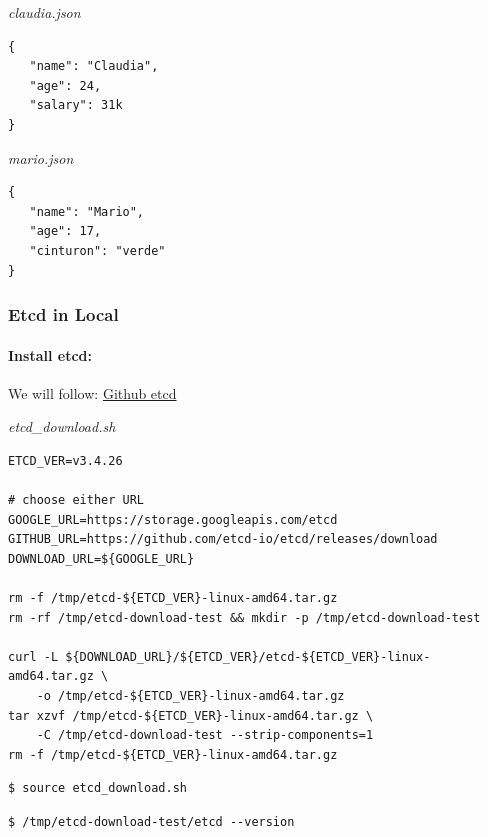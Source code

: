 \documentclass{article}
\newenvironment{codetemplate}[1][]{%
  \mybasecolorbox[#1]
  \itshape
}{%
  \endmybasecolorbox
}
\begin{document}
\begin{codetemplate}{claudia.json}
\begin{verbatim}
{
   "name": "Claudia",
   "age": 24,
   "salary": 31k
}
\end{verbatim}
\end{codetemplate}

\begin{codetemplate}{mario.json}
\begin{verbatim}
{
   "name": "Mario",
   "age": 17,
   "cinturon": "verde"
}
\end{verbatim}
\end{codetemplate}

\subsubsection{Etcd in Local}

\paragraph{Install etcd:}

We will follow: \href{https://github.com/etcd-io/etcd/releases/}{Github etcd}

\begin{codetemplate}{etcd\_download.sh}
\begin{verbatim}
ETCD_VER=v3.4.26

# choose either URL
GOOGLE_URL=https://storage.googleapis.com/etcd
GITHUB_URL=https://github.com/etcd-io/etcd/releases/download
DOWNLOAD_URL=${GOOGLE_URL}

rm -f /tmp/etcd-${ETCD_VER}-linux-amd64.tar.gz
rm -rf /tmp/etcd-download-test && mkdir -p /tmp/etcd-download-test

curl -L ${DOWNLOAD_URL}/${ETCD_VER}/etcd-${ETCD_VER}-linux-amd64.tar.gz \ 
    -o /tmp/etcd-${ETCD_VER}-linux-amd64.tar.gz
tar xzvf /tmp/etcd-${ETCD_VER}-linux-amd64.tar.gz \
    -C /tmp/etcd-download-test --strip-components=1
rm -f /tmp/etcd-${ETCD_VER}-linux-amd64.tar.gz
\end{verbatim}
\end{codetemplate}

\begin{codetemplate}{}
\begin{verbatim}
$ source etcd_download.sh
\end{verbatim}
\end{codetemplate}

\begin{codetemplate}{}
\begin{verbatim}
$ /tmp/etcd-download-test/etcd --version
\end{verbatim}
\end{codetemplate}
\end{document}
